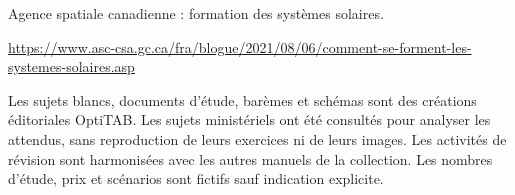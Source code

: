 \par\noindent\begin{minipage}{\linewidth}
Agence spatiale canadienne : formation des systèmes solaires.\par{\fontsize{8.5}{11}\selectfont\raggedright\url{https://www.asc-csa.gc.ca/fra/blogue/2021/08/06/comment-se-forment-les-systemes-solaires.asp}\par}\end{minipage}\par
{}
Les sujets blancs, documents d’étude, barèmes et schémas sont des créations éditoriales OptiTAB. Les sujets ministériels ont été consultés pour analyser les attendus, sans reproduction de leurs exercices ni de leurs images. Les activités de révision sont harmonisées avec les autres manuels de la collection. Les nombres d’étude, prix et scénarios sont fictifs sauf indication explicite.
